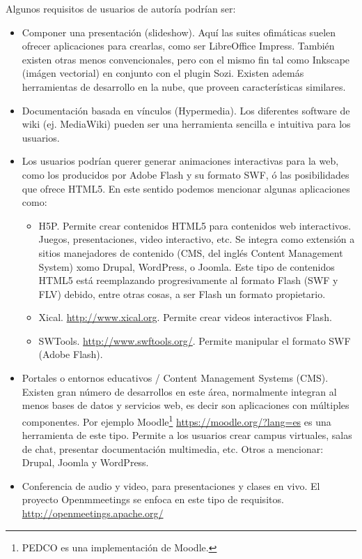 \documentclass[12pt]{article}
\begin{document}
Algunos requisitos de usuarios de autoría podrían ser:
\begin{itemize}
\item Componer una presentación (slideshow). Aquí las suites ofimáticas
suelen ofrecer aplicaciones para crearlas, como ser LibreOffice Impress. 
También existen otras menos convencionales, pero con el mismo fin tal como 
Inkscape (imágen vectorial) en conjunto con el plugin Sozi. Existen además 
herramientas de desarrollo en la nube, que proveen características similares.    
\item Documentación basada en vínculos (Hypermedia). Los diferentes software
de wiki (ej. MediaWiki) pueden ser una herramienta sencilla e intuitiva para 
los usuarios. 
\item Los usuarios podrían querer generar animaciones interactivas para la web, 
como los producidos por Adobe Flash y su formato SWF, ó las posibilidades que
ofrece HTML5. En este sentido podemos mencionar algunas aplicaciones como: 
	\begin{itemize}
	\item H5P. Permite crear contenidos HTML5 para contenidos web interactivos. Juegos, 
	      presentaciones, video interactivo, etc. Se integra como extensión a sitios 
	      manejadores de contenido (CMS, del inglés Content Management System) 
	      xomo Drupal, WordPress, o Joomla. Este tipo de contenidos HTML5 está
	      reemplazando progresivamente al formato Flash (SWF y FLV) debido, 
	      entre otras cosas, a ser Flash un formato propietario. 
	\item Xical. \url{http://www.xical.org}. Permite crear videos interactivos Flash. 
	\item SWTools. \url{http://www.swftools.org/}. Permite manipular el formato SWF (Adobe Flash).
	\end{itemize}
\item Portales o entornos educativos / Content Management Systems (CMS). 
Existen gran número de desarrollos en este área,
normalmente integran al menos bases de datos y servicios web, es decir son 
aplicaciones con múltiples componentes. Por ejemplo Moodle\footnote{PEDCO es una 
implementación de Moodle.} \url{https://moodle.org/?lang=es} es una herramienta
de este tipo. Permite a los usuarios crear campus virtuales, salas de chat, 
presentar documentación multimedia, etc. Otros a mencionar: Drupal, Joomla y WordPress. 
\item Conferencia de audio y video, para presentaciones y clases en vivo. El proyecto
Openmmeetings se enfoca en este tipo de requisitos. \url{http://openmeetings.apache.org/}
\end{itemize}
\end{document}
